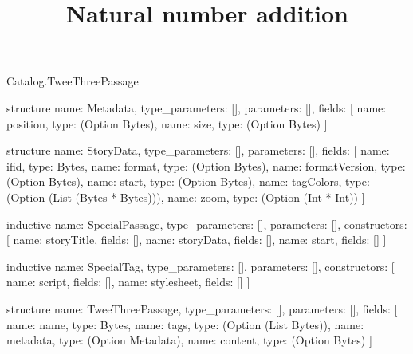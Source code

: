 \begin{lexlean}{Catalog.TweeThreePassage}
\title{Natural number addition}
\begin{semanticmodule}
structure{
  name: Metadata,
  type_parameters: [],
  parameters: [],
  fields: [
    {name: position, type: (Option Bytes)},
    {name: size, type: (Option Bytes)}
  ]
}

structure{
  name: StoryData,
  type_parameters: [],
  parameters: [],
  fields: [
    {name: ifid, type: Bytes},
    {name: format, type: (Option Bytes)},
    {name: formatVersion, type: (Option Bytes)},
    {name: start, type: (Option Bytes)},
    {name: tagColors, type: (Option (List (Bytes * Bytes)))},
    {name: zoom, type: (Option (Int * Int))}
  ]
}

inductive{
  name: SpecialPassage,
  type_parameters: [],
  parameters: [],
  constructors: [
    {name: storyTitle, fields: []},
    {name: storyData, fields: []},
    {name: start, fields: []}
  ]
}

inductive{
  name: SpecialTag,
  type_parameters: [],
  parameters: [],
  constructors: [
    {name: script, fields: []},
    {name: stylesheet, fields: []}
  ]
}

structure{
  name: TweeThreePassage,
  type_parameters: [],
  parameters: [],
  fields: [
    {name: name, type: Bytes},
    {name: tags, type: (Option (List Bytes))},
    {name: metadata, type: (Option Metadata)},
    {name: content, type: (Option Bytes)}
  ]
}
\end{semanticmodule}
\end{lexlean}
